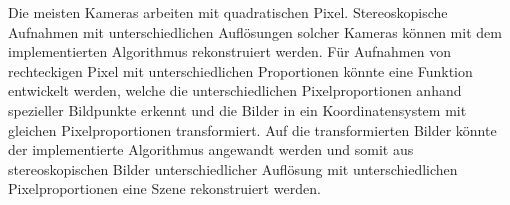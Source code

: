 Die meisten Kameras arbeiten mit quadratischen Pixel. Stereoskopische Aufnahmen mit unterschiedlichen Auflösungen solcher Kameras können mit dem implementierten Algorithmus rekonstruiert werden. Für Aufnahmen von rechteckigen Pixel mit unterschiedlichen Proportionen könnte eine Funktion entwickelt werden, welche die unterschiedlichen Pixelproportionen anhand spezieller Bildpunkte erkennt und die Bilder in ein Koordinatensystem mit gleichen Pixelproportionen transformiert. Auf die transformierten Bilder könnte der implementierte Algorithmus angewandt werden und somit aus stereoskopischen Bilder unterschiedlicher Auflösung mit unterschiedlichen Pixelproportionen eine Szene rekonstruiert werden.  



%
%
%
%
